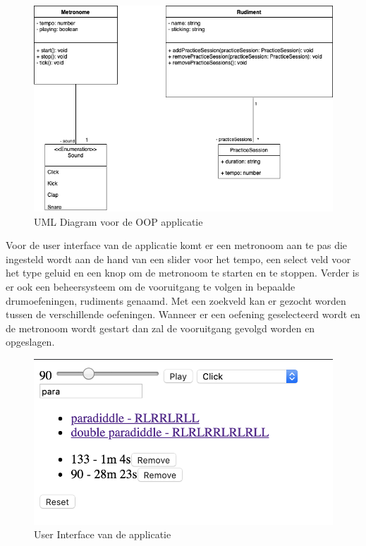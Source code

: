 \begin{figure}
    \includegraphics[width=\linewidth]{img/uml.png}
    \caption{UML Diagram voor de OOP applicatie}
    \label{fig:uml}
\end{figure}
 
 Voor de user interface van de applicatie komt er een metronoom aan te pas die ingesteld wordt aan de hand van een slider voor het tempo, een select veld voor het type geluid en een knop om de metronoom te starten en te stoppen. Verder is er ook een beheersysteem om de vooruitgang te volgen in bepaalde drumoefeningen, rudiments genaamd. Met een zoekveld kan er gezocht worden tussen de verschillende oefeningen. Wanneer er een oefening geselecteerd wordt en de metronoom wordt gestart dan zal de vooruitgang gevolgd worden en opgeslagen.

\begin{figure}
  \includegraphics[width=\linewidth]{img/ui.png}
  \caption{User Interface van de applicatie}
  \label{fig:uml}
\end{figure}

